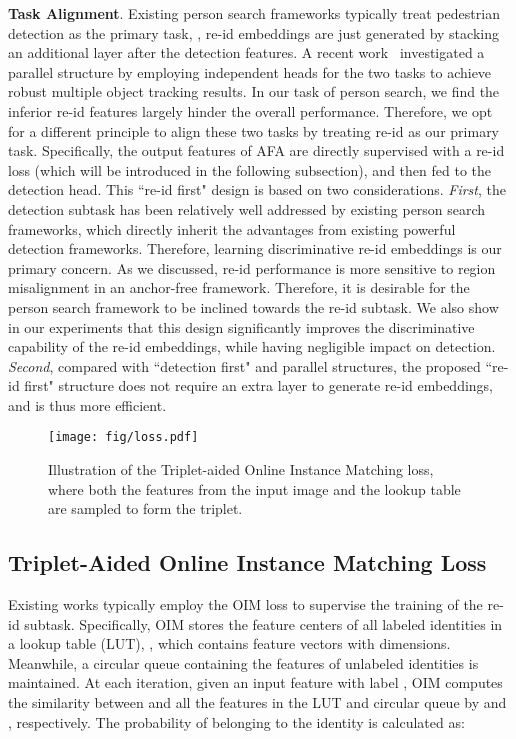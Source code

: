 \documentclass[final]{cvpr}
\begin{document}
\textbf{Task Alignment}. Existing person search frameworks typically treat pedestrian detection as the primary task, \ie, re-id embeddings are just generated by stacking an additional layer after the detection features. A recent work~\cite{DBLP:journals/corr/abs-2004-01888} investigated a parallel structure by employing independent heads for the two tasks to achieve robust multiple object tracking results. In our task of person search, we find the inferior re-id features largely hinder the overall performance. Therefore, we opt for a different principle to align these two tasks by treating re-id as our primary task. Specifically, the output features of AFA are directly supervised with a re-id loss (which will be introduced in the following subsection), and then fed to the detection head. This ``re-id first" design is based on two considerations. \emph{First}, the detection subtask has been relatively well addressed by existing person search frameworks, which directly inherit the advantages from existing powerful detection frameworks. Therefore, learning discriminative re-id embeddings is our primary concern. As we discussed, re-id performance is more sensitive to region misalignment in an anchor-free framework. Therefore, 
it is desirable for the person search framework to be inclined towards the re-id subtask. We also show in our experiments that this design significantly improves the discriminative capability of the re-id embeddings, while having negligible impact on detection. \emph{Second}, compared with ``detection first" and parallel structures, the proposed ``re-id first" structure does not require an extra layer to generate re-id embeddings, and is thus more efficient.

\begin{figure}[t]
\setlength{\abovecaptionskip}{1mm}
\centering
\texttt{[image: fig/loss.pdf]}
\caption{Illustration of the Triplet-aided Online Instance Matching loss, where both the features from the input image and the lookup table are sampled to form the triplet.}
\label{fig:loss}
\end{figure}

\subsection{Triplet-Aided Online Instance Matching Loss}
Existing works typically employ the OIM loss to supervise the training of the re-id subtask. Specifically, OIM stores the feature centers of all labeled identities in a lookup table (LUT), , which contains  feature vectors with  dimensions. Meanwhile, a circular queue  containing the features of  unlabeled identities is maintained. At each iteration, given an input feature  with label , OIM computes the similarity between  and all the features in the LUT and circular queue by  and , respectively. The probability of  belonging to the identity  is calculated as:
\end{document}

